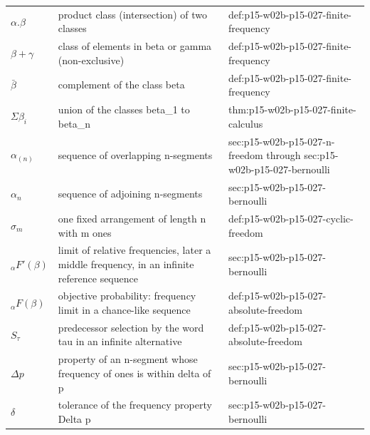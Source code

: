 \begin{longtable}{@{}p{}p{}p{}@{}}
\(\alpha.\beta\) & product class (intersection) of two classes & def:\allowbreak{}p15-\allowbreak{}w02b-\allowbreak{}p15-\allowbreak{}027-\allowbreak{}finite-\allowbreak{}frequency \\
\(\beta+\gamma\) & class of elements in beta or gamma (non-exclusive) & def:\allowbreak{}p15-\allowbreak{}w02b-\allowbreak{}p15-\allowbreak{}027-\allowbreak{}finite-\allowbreak{}frequency \\
\(\bar\beta\) & complement of the class beta & def:\allowbreak{}p15-\allowbreak{}w02b-\allowbreak{}p15-\allowbreak{}027-\allowbreak{}finite-\allowbreak{}frequency \\
\(\Sigma\beta_i\) & union of the classes beta\_1 to beta\_n & thm:\allowbreak{}p15-\allowbreak{}w02b-\allowbreak{}p15-\allowbreak{}027-\allowbreak{}finite-\allowbreak{}calculus \\
\(\alpha_{(n)}\) & sequence of overlapping n-segments & sec:\allowbreak{}p15-\allowbreak{}w02b-\allowbreak{}p15-\allowbreak{}027-\allowbreak{}n-\allowbreak{}freedom through sec:\allowbreak{}p15-\allowbreak{}w02b-\allowbreak{}p15-\allowbreak{}027-\allowbreak{}bernoulli \\
\(\alpha_n\) & sequence of adjoining n-segments & sec:\allowbreak{}p15-\allowbreak{}w02b-\allowbreak{}p15-\allowbreak{}027-\allowbreak{}bernoulli \\
\(\sigma_m\) & one fixed arrangement of length n with m ones & def:\allowbreak{}p15-\allowbreak{}w02b-\allowbreak{}p15-\allowbreak{}027-\allowbreak{}cyclic-\allowbreak{}freedom \\
\({}_{\alpha}F'(\beta)\) & limit of relative frequencies, later a middle frequency, in an infinite reference sequence & sec:\allowbreak{}p15-\allowbreak{}w02b-\allowbreak{}p15-\allowbreak{}027-\allowbreak{}bernoulli \\
\({}_{\alpha}F(\beta)\) & objective probability: frequency limit in a chance-like sequence & def:\allowbreak{}p15-\allowbreak{}w02b-\allowbreak{}p15-\allowbreak{}027-\allowbreak{}absolute-\allowbreak{}freedom \\
\(S_\tau\) & predecessor selection by the word tau in an infinite alternative & def:\allowbreak{}p15-\allowbreak{}w02b-\allowbreak{}p15-\allowbreak{}027-\allowbreak{}absolute-\allowbreak{}freedom \\
\(\Delta p\) & property of an n-segment whose frequency of ones is within delta of p & sec:\allowbreak{}p15-\allowbreak{}w02b-\allowbreak{}p15-\allowbreak{}027-\allowbreak{}bernoulli \\
\(\delta\) & tolerance of the frequency property Delta p & sec:\allowbreak{}p15-\allowbreak{}w02b-\allowbreak{}p15-\allowbreak{}027-\allowbreak{}bernoulli \\

\end{longtable}
